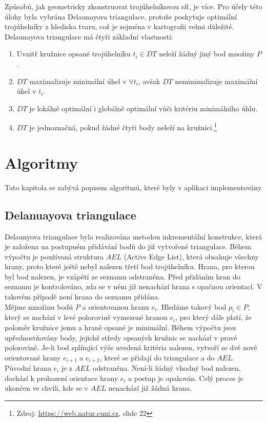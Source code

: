\documentclass[a4paper, 12pt]{article}
\begin{document}
Způsobů, jak geometricky zkonstruovat trojúhelníkovou síť, je více. Pro účely této úlohy byla vybrána Delaunayova triangulace, protože poskytuje optimální trojúhelníky z hlediska tvaru, což je zejména v kartografii velmi důležité. Delaunayova triangulace má čtyři základní vlastnosti:
\begin{enumerate}
\item Uvnitř kružnice opsané trojúhelníku $t_i \in DT$ neleží žádný jiný bod množiny $P$.
\item $DT$ maximalizuje minimální úhel v $\forall t_i$, avšak $DT$ neminimalizuje maximální úhel v $t_i$.
\item $DT$ je lokálně optimální i globálně optimální vůči kritériu minimálního úhlu.
\item $DT$ je jednoznačná, pokud žádné čtyři body neleží na kružnici.\footnote{Zdroj: \href{https://web.natur.cuni.cz/~bayertom/images/courses/Adk/adk5.pdf}{https://web.natur.cuni.cz}, slide 22}
\end{enumerate}
\vspace{0.4cm}

\section{Algoritmy}
Tato kapitola se zabývá popisem algoritmů, které byly v aplikaci implementovány. 

\subsection{Delanuayova triangulace}
Delaunyova triangulace byla realizována metodou inkrementální konstrukce, která je založena na postupném přidávání bodů do již vytvořené triangulace. Během výpočtu je používaná struktura $AEL$ (Active Edge List), která obsahuje všechny hrany, proto které ještě nebyl nalezen třetí bod trojúhelníku. Hrana, pro kterou byl bod nalezen, je vzápětí ze seznamu odstraněna. Před přidáním hran do seznamu je kontrolováno, zda se v něm již nenachází hrana s opačnou orientací. V takovém případě není hrana do seznamu přidána.\\

Mějme množinu bodů $P$ a orientovanou hranu $e_i$. Hledáme takový bod $p_i \in P$, který se nachází v levé polorovině vymezené hranou $e_i$, pro který dále platí, že poloměr kružnice jemu a hraně opsané je minimální. Během výpočtu jsou upřednostňovány body, jejichž středy opsaných kružnic se nachází v pravé polorovině. Je-li bod splňující výše uvedená kritéria nalezen, vytvoří se dvě nové orientované hrany $e_{i+1}$ a $e_{i+2}$, které se přidají do triangulace a do $AEL$. Původní hrana $e_i$ je z $AEL$ odstraněna. Není-li žádný vhodný bod nalezen, dochází k prohození orientace hrany $e_i$ a postup je opakován. Celý proces je ukončen ve chvíli, kde se v $AEL$ nenachází již žádná hrana. \\ 
\end{document}
